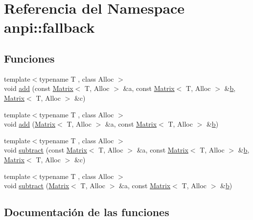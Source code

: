 \hypertarget{namespaceanpi_1_1fallback}{}\section{Referencia del Namespace anpi\+:\+:fallback}
\label{namespaceanpi_1_1fallback}
\subsection*{Funciones}
\begin{DoxyCompactItemize}
\item 
{\footnotesize template$<$typename T , class Alloc $>$ }\\void \hyperlink{namespaceanpi_1_1fallback_a24c6fc021f114dc70158be580ee78fda}{add} (const \hyperlink{classanpi_1_1Matrix}{Matrix}$<$ T, Alloc $>$ \&a, const \hyperlink{classanpi_1_1Matrix}{Matrix}$<$ T, Alloc $>$ \&\hyperlink{program__options_8cpp_a03799bd905ea96cd38435410694bf05b}{b}, \hyperlink{classanpi_1_1Matrix}{Matrix}$<$ T, Alloc $>$ \&c)
\item 
{\footnotesize template$<$typename T , class Alloc $>$ }\\void \hyperlink{namespaceanpi_1_1fallback_a7618281e2e5eff8773323b9815f974ab}{add} (\hyperlink{classanpi_1_1Matrix}{Matrix}$<$ T, Alloc $>$ \&a, const \hyperlink{classanpi_1_1Matrix}{Matrix}$<$ T, Alloc $>$ \&\hyperlink{program__options_8cpp_a03799bd905ea96cd38435410694bf05b}{b})
\item 
{\footnotesize template$<$typename T , class Alloc $>$ }\\void \hyperlink{namespaceanpi_1_1fallback_a5edefd65be498d783018b1a7a8bf48b0}{subtract} (const \hyperlink{classanpi_1_1Matrix}{Matrix}$<$ T, Alloc $>$ \&a, const \hyperlink{classanpi_1_1Matrix}{Matrix}$<$ T, Alloc $>$ \&\hyperlink{program__options_8cpp_a03799bd905ea96cd38435410694bf05b}{b}, \hyperlink{classanpi_1_1Matrix}{Matrix}$<$ T, Alloc $>$ \&c)
\item 
{\footnotesize template$<$typename T , class Alloc $>$ }\\void \hyperlink{namespaceanpi_1_1fallback_a33e33fc558cc7712504723cd2d9ac5b9}{subtract} (\hyperlink{classanpi_1_1Matrix}{Matrix}$<$ T, Alloc $>$ \&a, const \hyperlink{classanpi_1_1Matrix}{Matrix}$<$ T, Alloc $>$ \&\hyperlink{program__options_8cpp_a03799bd905ea96cd38435410694bf05b}{b})
\end{DoxyCompactItemize}


\subsection{Documentación de las funciones}
\mbox{\label{namespaceanpi_1_1fallback_a24c6fc021f114dc70158be580ee78fda}} 
